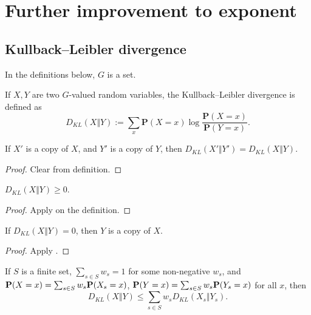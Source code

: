 \chapter{Further improvement to exponent}

\section{Kullback--Leibler divergence}

In the definitions below, $G$ is a set.

\begin{definition}\label{kl-div}\leanok If $X,Y$ are two $G$-valued random variables, the Kullback--Leibler divergence is defined as
  $$ D_{KL}(X\Vert Y) := \sum_x \mathbf{P}(X=x) \log \frac{\mathbf{P}(X=x)}{\mathbf{P}(Y=x)}.$$
\end{definition}

\begin{lemma}
  \label{kl-div-copy}
  \leanok

  If $X'$ is a copy of $X$, and $Y'$ is a copy of $Y$, then $D_{KL}(X'\Vert Y') = D_{KL}(X\Vert Y)$.
\end{lemma}

\begin{proof}\leanok  Clear from definition.
\end{proof}

\begin{lemma}\label{Gibbs}\leanok  $D_{KL}(X\Vert Y) \geq 0$.
\end{lemma}

\begin{proof}\leanok
  Apply  on the definition.
\end{proof}

\begin{lemma}\label{Gibbs-converse}\leanok  If $D_{KL}(X\Vert Y) = 0$, then $Y$ is a copy of $X$.
\end{lemma}

\begin{proof}\leanok
  Apply .
\end{proof}

\begin{lemma}\label{kl-div-convex}\leanok  If $S$ is a finite set, $\sum_{s \in S} w_s = 1$ for some non-negative $w_s$, and ${\bf P}(X=x) = \sum_{s\in S} w_s  {\bf P}(X_s=x)$, ${\bf P}(Y=x) = \sum_{s\in S} w_s  {\bf P}(Y_s=x)$ for all $x$, then
$$D_{KL}(X\Vert Y) \le \sum_{s\in S} w_s D_{KL}(X_s\Vert Y_s).$$
\end{lemma}

